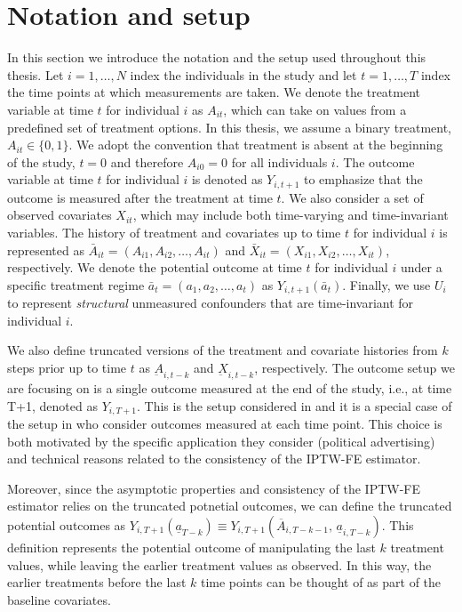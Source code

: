 \chapter{Notation and setup}
In this section we introduce the notation and the setup used throughout this thesis. 
Let $i=1, \ldots, N$ index the individuals in the study and let $t=1, \ldots, T$ 
index the time points at which measurements are taken. We denote the treatment 
variable at time $t$ for individual $i$ as $A_{it}$, which can take on values from a 
predefined set of treatment options. In this thesis, 
we assume a binary treatment, $A_{it} \in \{0,1\}$. We adopt the convention that treatment 
is absent at the beginning of the study, $t=0$ and therefore $A_{i0} = 0$ 
for all individuals $i$. 
The outcome variable at 
time $t$ for individual $i$ is 
denoted as $Y_{i,t+1}$ to emphasize that the outcome is measured after the treatment at time $t$.
We also consider a set of observed covariates $X_{it}$, 
which may include both time-varying 
and time-invariant variables. The history of treatment and covariates up to time $t$ for 
individual $i$ is represented as
$\bar{A}_{it} = (A_{i1}, A_{i2}, \ldots, A_{it})$ and $\bar{X}_{it} = (X_{i1}, X_{i2}, \ldots, X_{it})$, 
respectively. We denote the potential outcome at time $t$ for individual $i$ under a specific treatment
regime $\bar{a}_t = (a_1, a_2, \ldots, a_t)$ as $Y_{i,t+1}(\bar{a}_t)$. Finally, we use $U_i$ 
to represent \emph{structural} unmeasured confounders that are time-invariant for individual $i$. 

We also define truncated versions of the treatment and covariate histories from \(k\) 
steps prior up to time \(t\) as \(\underbar{A}_{i,t-k}\) and \(\underbar{X}_{i,t-k}\), respectively. 
The outcome setup we are focusing on is a single outcome measured at the end of 
the study, i.e., at time T+1, denoted as $Y_{i,T+1}$. This is the setup considered in
\cite{blackwellEffectPoliticalAdvertising2024} and it is a special case of the setup in
\cite{hattSequentialDeconfoundingCausal2024} who consider outcomes measured at each time point. This 
choice is both motivated by the specific application they consider 
(political advertising) and technical reasons related to the consistency of the IPTW-FE estimator.

Moreover, since the asymptotic properties and consistency of the IPTW-FE estimator relies on the 
truncated potnetial outcomes, we can define the truncated potential outcomes as
$Y_{i,T+1}(\underline{a}_{T-k}) \equiv Y_{i,T+1}(\overline{A}_{i,T-k-1},\, \underline{a}_{i,T-k})$. This 
definition represents the potential outcome of manipulating 
the last $k$ treatment values, while leaving the earlier treatment values as observed. In this way, 
the earlier treatments before the last $k$ time points can be thought of as part of the baseline covariates. 
